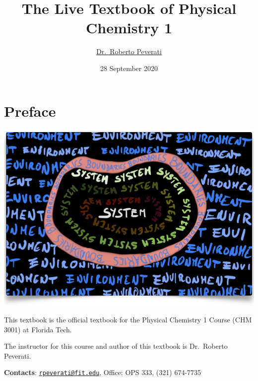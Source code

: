 \documentclass[
  9pt,
]{extbook}
\title{The Live Textbook of Physical Chemistry 1}
\author{\href{mailto:rpeverati@fit.edu}{Dr.~Roberto Peverati}}
\date{28 September 2020}
\let\oldmaketitle\maketitle
\theoremstyle{definition}
\theoremstyle{definition}
\theoremstyle{definition}
\theoremstyle{remark}
\begin{document}
\maketitle


%
\newpage

\let\maketitle\oldmaketitle

\renewcommand\thepage{\romannumeral\numexpr\value{page}-1\relax}


{
\setcounter{tocdepth}{1}
\tableofcontents
}
\renewcommand{\arraystretch}{1.8}

\hypertarget{preface}{%
\chapter*{Preface}\label{preface}}

\begin{center}\includegraphics[width=0.8\linewidth]{./img/OEP_Figures.000} \end{center}

This textbook is the official textbook for the Physical Chemistry 1 Course (CHM 3001) at Florida Tech.

The instructor for this course and author of this textbook is Dr.~Roberto Peverati.

\textbf{Contacts}: \href{mailto:rpeverati@fit.edu}{\nolinkurl{rpeverati@fit.edu}}, Office: OPS 333, (321) 674-7735
\end{document}

